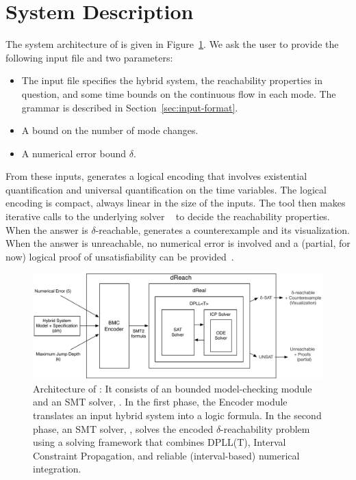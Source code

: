 \section{System Description}\label{sec:system}
The system architecture of \dReach{} is given in Figure~\ref{sec:system}. We ask the user to provide the following input file and two parameters:
\begin{itemize}
\item The input file specifies the hybrid system, the reachability
  properties in question, and some time bounds on the continuous flow in each mode.
  The grammar is described in
  Section~\ref{sec:input-format}.
\item A bound on the number of mode changes.
\item A numerical error bound $\delta$.%
\end{itemize}
From these inputs, \dReach{} generates a logical encoding that involves existential quantification and universal quantification on the time variables. The logical encoding is compact, always linear in the size of the inputs. The tool then makes iterative calls to the underlying solver \dReal{}~\cite{DBLP:conf/cade/GaoKC13} to decide the reachability properties. When the answer is {\sf $\delta$-reachable}, \dReach{} generates a counterexample and its visualization. When the answer is {\sf unreachable}, no numerical error is involved and a (partial, for now) logical proof of unsatisfiability can be provided~\cite{SYNASC14}.
\begin{figure}[t]
  \centering
  \includegraphics[width=\textwidth]{images/dreach_archi}
  \caption{Architecture of \dReach{}: It consists of an bounded
    model-checking module and an SMT solver, \dReal{}. In the first
    phase, the Encoder module translates an input hybrid system into a
    logic formula. In the second phase, an
    SMT solver, \dReal{}, solves the encoded $\delta$-reachability
    problem using a solving framework that combines DPLL(T), Interval Constraint Propagation, and reliable (interval-based) numerical integration.
  }\label{fig:system-description}
\end{figure}



